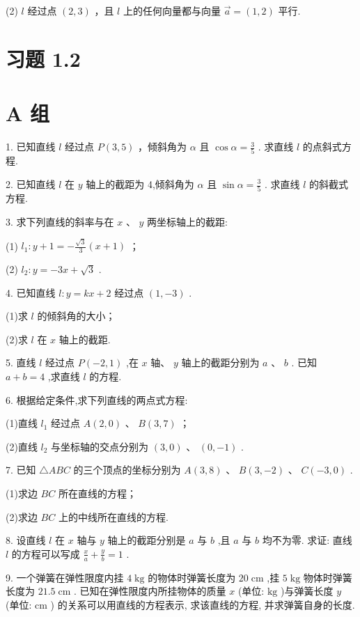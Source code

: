\documentclass[10pt]{article}
\begin{document}
(2) \(l\) 经过点 \(\left( {2,3}\right)\) ，且 \(l\) 上的任何向量都与向量 \(\overrightarrow{a} = \left( {1,2}\right)\) 平行.

\section*{习题 1.2}

\section*{A 组}

1. 已知直线 \(l\) 经过点 \(P\left( {3,5}\right)\) ，倾斜角为 \(\alpha\) 且 \(\cos \alpha  = \frac{3}{5}\) . 求直线 \(l\) 的点斜式方程.

2. 已知直线 \(l\) 在 \(y\) 轴上的截距为 4,倾斜角为 \(\alpha\) 且 \(\sin \alpha  = \frac{3}{5}\) . 求直线 \(l\) 的斜截式方程.

3. 求下列直线的斜率与在 \(x\text{ 、 }y\) 两坐标轴上的截距:

(1) \({l}_{1} : {y + 1} =  - \frac{\sqrt{3}}{3}\left( {x + 1}\right)\) ；

(2) \({l}_{2} : y =  - {3x} + \sqrt{3}\) .

4. 已知直线 \(l : y = {kx} + 2\) 经过点 \(\left( {1, - 3}\right)\) .

(1)求 \(l\) 的倾斜角的大小；

(2)求 \(l\) 在 \(x\) 轴上的截距.

5. 直线 \(l\) 经过点 \(P\left( {-2,1}\right)\) ,在 \(x\) 轴、 \(y\) 轴上的截距分别为 \(a\text{ 、 }b\) . 已知 \(a + b = 4\) ,求直线 \(l\) 的方程.

6. 根据给定条件,求下列直线的两点式方程:

(1)直线 \({l}_{1}\) 经过点 \(A\left( {2,0}\right)\) 、 \(B\left( {3,7}\right)\) ；

(2)直线 \({l}_{2}\) 与坐标轴的交点分别为 \(\left( {3,0}\right) \text{ 、 }\left( {0, - 1}\right)\) .

7. 已知 \(\bigtriangleup  {ABC}\) 的三个顶点的坐标分别为 \(A\left( {3,8}\right)\) 、 \(B\left( {3, - 2}\right)\) 、 \(C\left( {-3,0}\right)\) .

(1)求边 \({BC}\) 所在直线的方程；

(2)求边 \({BC}\) 上的中线所在直线的方程.

8. 设直线 \(l\) 在 \(x\) 轴与 \(y\) 轴上的截距分别是 \(a\) 与 \(b\) ,且 \(a\) 与 \(b\) 均不为零. 求证: 直线 \(l\) 的方程可以写成 \(\frac{x}{a} + \frac{y}{b} = 1\) .

9. 一个弹簧在弹性限度内挂 \(4\mathrm{\;{kg}}\) 的物体时弹簧长度为 \({20}\mathrm{\;{cm}}\) ,挂 \(5\mathrm{\;{kg}}\) 物体时弹簧长度为 \({21.5}\mathrm{\;{cm}}\) . 已知在弹性限度内所挂物体的质量 \(x\) (单位: \(\mathrm{{kg}}\) )与弹簧长度 \(y\) (单位: \(\mathrm{{cm}}\) ) 的关系可以用直线的方程表示, 求该直线的方程, 并求弹簧自身的长度.
\end{document}
